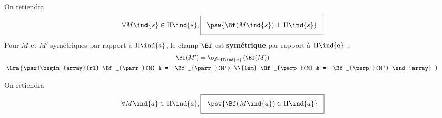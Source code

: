 \documentclass[../../main/main.tex]{subfiles}
\begin{document}
\begin{tcb*}
\begin{isd}[sidebyside align=top]
\begin{center}
{			}
		\end{center}
		On retiendra
		\[
			\setlength{\fboxsep}{3mm}
			\forall M\ind{s} \in \Pi\ind{s},
			\boxed{
				\psw{%
					\Bf (M\ind{s}) \perp \Pi\ind{s}
				}%
			}
		\]
		\tcblower
		Pour $M$ et $M'$ symétriques par rapport à $\Pi\ind{a}$, le champ $\Bf$ est
		\textbf{symétrique} par rapport à $\Pi\ind{a}$~:
		\begin{gather*}
			\Bf(M') = \sym_{\Pi\ind{a}} \left(\Bf(M)\right)
			\\\Lra
			\left\{
			\psw{%
				\begin{array}{rl}
					\Bf_{\parr}(M) & = +\Bf_{\parr}(M')
					\\[1em]
					\Bf_{\perp}(M) & = -\Bf_{\perp}(M')
				\end{array}
			}%
			\right.
		\end{gather*}
		\begin{center}
		\end{center}
		On retiendra
		\[
			\setlength{\fboxsep}{3mm}
			\forall M\ind{a} \in \Pi\ind{a},
			\boxed{
				\psw{%
					\Bf (M\ind{a}) \in \Pi\ind{a}
				}%
			}
		\]
	\end{isd}
\end{tcb*}
\end{document}
